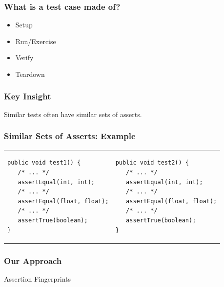 \documentclass{beamer}
\begin{document}
\begin{frame}
  \frametitle{What is a test case made of?} {\small	
     \vspace*{-1em}
     \Large
     \begin{itemize}
        \item Setup
           \vspace{0.5cm}
        \item Run/Exercise
           \vspace{0.5cm}
        \item \alert<2>{Verify}
           \vspace{0.5cm}
        \item Teardown
     \end{itemize}
	}
\end{frame}

\begin{frame}
  \frametitle{Key Insight} {\small	
     \Large
\begin{center}
     Similar tests often have similar sets of asserts.
\end{center}
	}
\end{frame}

\begin{frame}[fragile]
  \frametitle{Similar Sets of Asserts: Example} {\small	
     \begin{tabular}{ll}
        \begin{minipage}{0.51\textwidth}
\begin{lstlisting}[]
public void test1() {
   /* ... */
   assertEqual(int, int);
   /* ... */
   assertEqual(float, float);
   /* ... */
   assertTrue(boolean);
}
\end{lstlisting}
        \end{minipage}
        &
        \begin{minipage}{0.51\textwidth}
\begin{lstlisting}[]
public void test2() {
   /* ... */
   assertEqual(int, int);
   /* ... */
   assertEqual(float, float);
   /* ... */
   assertTrue(boolean);
}
\end{lstlisting}
        \end{minipage}
     \end{tabular}
	}
\end{frame}
\note{}

\begin{frame}
  \frametitle{Our Approach} {\small	
     \hspace*{3em}
     \Huge
     Assertion Fingerprints
	}
\end{frame}
\end{document}
